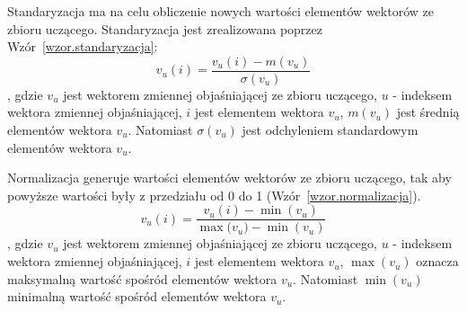 \documentclass[a4paper,twoside,12pt]{book}
\begin{document}
    Standaryzacja ma na celu obliczenie nowych wartości elementów wektorów ze zbioru uczącego.
    Standaryzacja jest zrealizowana poprzez Wzór~\ref{wzor.standaryzacja}:
    \large
    \begin{equation}
    {v}
        _{u}(i) = \frac{{v}_{u}(i)-m({v}_{u})}{\sigma({v}_{u})}
        \label{wzor.standaryzacja}
    \end{equation}
    \normalsize
    , gdzie ${v}_{u}$ jest wektorem zmiennej objaśniającej ze zbioru uczącego, $u$ - indeksem wektora zmiennej
    objaśniającej, $i$ jest elementem wektora ${v}_{u}$, $m({v}_{u})$ jest średnią elementów wektora
    ${v}_{u}$. Natomiast $\sigma({v}_{u})$ jest odchyleniem standardowym elementów wektora ${v}_{u}$.

    Normalizacja generuje wartości elementów wektorów ze zbioru uczącego, tak aby powyższe wartości były z przedziału
    od 0 do 1 (Wzór~\ref{wzor.normalizacja}).
    \large
    \begin{equation}
    {v}
        _{u}(i) = \frac{{v}_{u}(i)-\min({{v}_{u}})}{\max({{v}_{u})}-\min({{v}_{u}})}
        \label{wzor.normalizacja}
    \end{equation}
    \normalsize
    , gdzie ${v}_{u}$ jest wektorem zmiennej objaśniającej ze zbioru uczącego, $u$ - indeksem wektora zmiennej
    objaśniającej, $i$ jest elementem wektora ${v}_{u}$, $\max({v}_{u})$ oznacza maksymalną wartość spośród elementów
    wektora ${v}_{u}$. Natomiast $\min({v}_{u})$ minimalną wartość spośród elementów
    wektora ${v}_{u}$.
\end{document}
